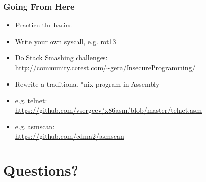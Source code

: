 \documentclass[11pt,xcolor=dvipsnames]{beamer}
\begin{document}
\begin{frame}[fragile,t]
\frametitle{Going From Here}
\begin{itemize}
  \item Practice the basics
  \item Write your own syscall, e.g. rot13
  \item Do Stack Smashing challenges: \\ \url{http://community.corest.com/~gera/InsecureProgramming/}
  \item Rewrite a traditional *nix program in Assembly
  \item e.g. telnet: \\ {\small \url{https://github.com/vsergeev/x86asm/blob/master/telnet.asm}}
  \item e.g. asmscan: \\ {\small \url{https://github.com/edma2/asmscan}}
\end{itemize}
\end{frame}

\section*{Questions?}
\end{document}
